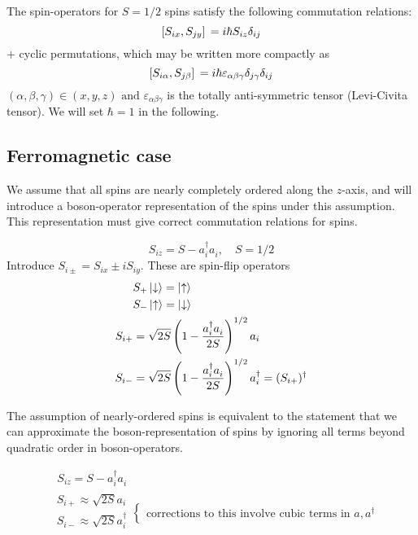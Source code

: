 The spin-operators for $S = 1/2$ spins satisfy the following commutation relations:
\begin{equation}
	\comm*{S_{ix}}{S_{jy}} = i\hbar S_{iz}\delta_{ij}
\end{equation}
+ cyclic permutations, which may be written more compactly as
\begin{equation}
	\comm*{S_{i\alpha}}{S_{j\beta}} = i\hbar \varepsilon_{\alpha\beta\gamma} \delta_{j\gamma} \delta_{ij} \\
\end{equation}
$(\alpha, \beta, \gamma) \in (x, y, z)  \text{ and } \varepsilon_{\alpha\beta\gamma}$ is the totally anti-symmetric tensor (Levi-Civita tensor). We will set $\hbar = 1$ in the following. \\

\subsection{Ferromagnetic case}
We assume that all spins are nearly completely ordered along the $z$-axis, and will introduce a boson-operator representation of the spins under this assumption. This representation must give correct commutation relations for spins.

\begin{equation}
	S_{iz} = S - a_i^\dagger a_i^{}, \quad S = 1/2
\end{equation}
Introduce $S_{i\pm} = S_{ix} \pm iS_{iy}$. These are spin-flip operators
\begin{align}
	&S_+ \ket{\downarrow} = \ket{\uparrow} \\
	&S_- \ket{\uparrow} = \ket{\downarrow} \\
	S_{i+} &= \sqrt{2S}\left (1-\frac{a_i^\dagger a_i^{}}{2S}\right )^{1/2}a_i \\
	S_{i-} &= \sqrt{2S}\left (1-\frac{a_i^\dagger a_i^{}}{2S}\right )^{1/2}a_i^\dagger = (S_{i+})^\dagger
\end{align}

The assumption of nearly-ordered spins is equivalent to the statement that we can approximate the boson-representation of spins by ignoring all terms beyond quadratic order in boson-operators.

\begin{align}
	& \ \ S_{iz} = S - a_i^\dagger a_i^{} \\
	&\begin{array}{c}
		S_{i+} \approx \sqrt{2S}a_i \\
		S_{i-} \approx \sqrt{2S}a_i^\dagger \\
	\end{array}
	\begin{cases}
		\text{corrections to this involve cubic terms in } a, a^\dagger 
	\end{cases}
\end{align}

